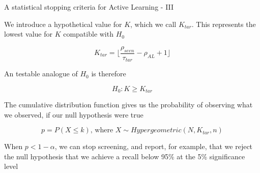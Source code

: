 \documentclass[9pt, aspectratio=169]{beamer}
\begin{document}
\begin{frame}{A statistical stopping criteria for Active Learning - III}

		
We introduce a hypothetical value for $K$, which we call $K_{tar}$. This represents the lowest value for $K$ compatible with $H_0$

\begin{equation}
K_{tar} = \lfloor \frac{\rho_{seen}}{\tau_{tar}}-\rho_{AL}+1 \rfloor
\end{equation}

An testable analogue of $H_0$ is therefore

\begin{equation}
H_0 : K \geq K_{tar}
\end{equation}

The cumulative distribution function gives us the probability of observing what we observed, if our null hypothesis were true

\begin{equation}
p = P(X \leq k) \text{, where } X \sim Hypergeometric(N,K_{tar},n)
\label{eq:p-value}
\end{equation}

When $p < 1-\alpha$, we can stop screening, and report, for example, that we reject the null hypothesis that we achieve a recall below 95\% at the 5\% significance level

\end{frame}
\end{document}
